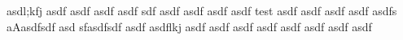 asdl;kfj asdf asdf asdf asdf sdf asdf asdf asdf asdf test asdf asdf asdf asdf asdfs aAasdfsdf asd sfasdfsdf asdf asdflkj asdf asdf asdf asdf asdf asdf asdf asdf

